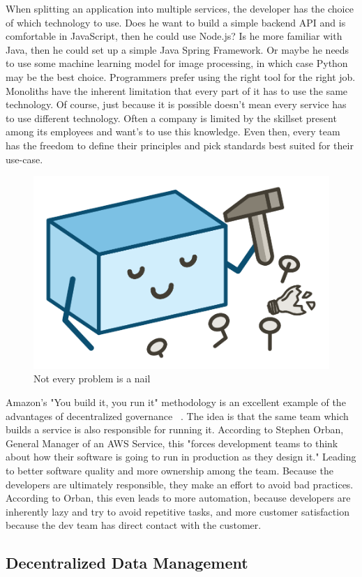 When splitting an application into multiple services, the developer has the choice of which technology to use. Does he want to build a simple backend API and is comfortable in JavaScript, then he could use Node.js? Is he more familiar with Java, then he could set up a simple Java Spring Framework. Or maybe he needs to use some machine learning model for image processing, in which case Python may be the best choice. Programmers prefer using the right tool for the right job. Monoliths have the inherent limitation that every part of it has to use the same technology. Of course, just because it is possible doesn't mean every service has to use different technology. Often a company is limited by the skillset present among its employees and want's to use this knowledge. Even then, every team has the freedom to define their principles and pick standards best suited for their use-case.

\begin{figure}[ht]
  \centering
  \includegraphics[width=0.4\linewidth]{assets/illustration-monolith-hammer.png}
  \caption{Not every problem is a nail}
\end{figure}

Amazon's "You build it, you run it" methodology is an excellent example of the advantages of decentralized governance ~\cite{amazon.2015}. The idea is that the same team which builds a service is also responsible for running it. According to Stephen Orban, General Manager of an AWS Service, this "forces development teams to think about how their software is going to run in production as they design it." Leading to better software quality and more ownership among the team. Because the developers are ultimately responsible,  they make an effort to avoid bad practices. According to Orban, this even leads to more automation, because developers are inherently lazy and try to avoid repetitive tasks, and more customer satisfaction because the dev team has direct contact with the customer.


\subsection{Decentralized Data Management}
\label{sec:theory:decentralized-data}

